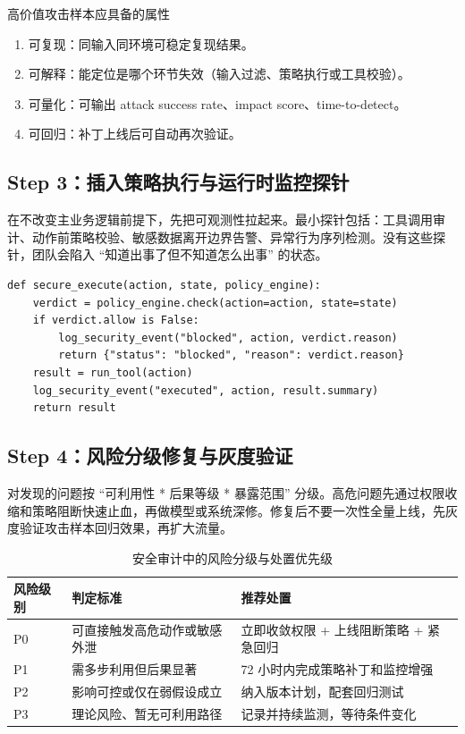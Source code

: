 \documentclass[a4paper]{article}
\begin{document}
\begin{importantbox}{高价值攻击样本应具备的属性}
\begin{enumerate}
    \item 可复现：同输入同环境可稳定复现结果。
    \item 可解释：能定位是哪个环节失效（输入过滤、策略执行或工具校验）。
    \item 可量化：可输出 attack success rate、impact score、time-to-detect。
    \item 可回归：补丁上线后可自动再次验证。
\end{enumerate}
\end{importantbox}

\subsection{Step 3：插入策略执行与运行时监控探针}
在不改变主业务逻辑前提下，先把可观测性拉起来。最小探针包括：工具调用审计、动作前策略校验、敏感数据离开边界告警、异常行为序列检测。没有这些探针，团队会陷入 ``知道出事了但不知道怎么出事'' 的状态。

\begin{lstlisting}[caption={动作执行前安全检查示意}]
def secure_execute(action, state, policy_engine):
    verdict = policy_engine.check(action=action, state=state)
    if verdict.allow is False:
        log_security_event("blocked", action, verdict.reason)
        return {"status": "blocked", "reason": verdict.reason}
    result = run_tool(action)
    log_security_event("executed", action, result.summary)
    return result
\end{lstlisting}

\subsection{Step 4：风险分级修复与灰度验证}
对发现的问题按 ``可利用性 * 后果等级 * 暴露范围'' 分级。高危问题先通过权限收缩和策略阻断快速止血，再做模型或系统深修。修复后不要一次性全量上线，先灰度验证攻击样本回归效果，再扩大流量。

\begin{table}[H]
\centering
\begin{tabular}{p{2.0cm}p{3.5cm}p{4.8cm}}
\toprule
\textbf{风险级别} & \textbf{判定标准} & \textbf{推荐处置} \\
\midrule
P0 & 可直接触发高危动作或敏感外泄 & 立即收敛权限 + 上线阻断策略 + 紧急回归 \\
P1 & 需多步利用但后果显著 & 72 小时内完成策略补丁和监控增强 \\
P2 & 影响可控或仅在弱假设成立 & 纳入版本计划，配套回归测试 \\
P3 & 理论风险、暂无可利用路径 & 记录并持续监测，等待条件变化 \\
\bottomrule
\end{tabular}
\caption{安全审计中的风险分级与处置优先级}
\end{table}
\end{document}
